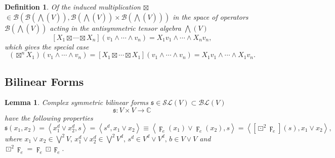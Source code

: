 \documentclass[aps,preprint]{revtex4}%
\newtheorem{definition}[theorem]{Definition}
\newtheorem{lemma}[theorem]{Lemma}
\begin{document}
\begin{definition}
Of the induced multiplication $\boxtimes$ $\in\mathcal{B}\left(
\mathcal{B}\left(
{\textstyle\bigwedge}
\left(  \overset{}{V}\right)  \right)  ,\mathcal{B}\left(
{\textstyle\bigwedge}
\left(  \overset{}{V}\right)  \right)  \times\mathcal{B}\left(
{\textstyle\bigwedge}
\left(  \overset{}{V}\right)  \right)  \right)  $ in the space of operators
$\mathcal{B}\left(
{\textstyle\bigwedge}
\left(  \overset{}{V}\right)  \right)  $ acting in the antisymmetric tensor
algebra $%
{\textstyle\bigwedge}
\left(  V\right)  $
\begin{equation}
\left[  X_{1}\boxtimes\cdots\boxtimes X_{n}\right]  \left(  v_{1}\wedge
\cdots\wedge v_{n}\right)  =X_{1}v_{1}\wedge\cdots\wedge X_{n}v_{n},
\end{equation}
which gives the special case
\begin{equation}
\left(  \boxtimes^{n}X_{1}\right)  \left(  v_{1}\wedge\cdots\wedge
v_{n}\right)  =\left[  X_{1}\boxtimes\cdots\boxtimes X_{1}\right]  \left(
v_{1}\wedge\cdots\wedge v_{n}\right)  =X_{1}v_{1}\wedge\cdots\wedge X_{1}%
v_{n}.
\end{equation}

\end{definition}

\subsection{Bilinear Forms}

\begin{lemma}
Complex symmetric bilinear forms $\mathfrak{s\in}\mathcal{SL}\left(  V\right)
\subset\mathcal{BL}\left(  V\right)  $%
\begin{equation}
\mathfrak{s}:V\times V\rightarrow\mathbb{C}%
\end{equation}
have the following properties
\begin{equation}
\mathfrak{s}\left(  x_{1},x_{2}\right)  =\left\langle x_{1}^{d}\vee x_{2}%
^{d},s\right\rangle =\left\langle s^{d},x_{1}\vee x_{2}\right\rangle
\equiv\left\langle \digamma_{e}\left(  x_{1}\right)  \vee\digamma_{e}\left(
x_{2}\right)  ,s\right\rangle =\left\langle \left[  \boxdot^{2}\digamma
_{e}\right]  \left(  s\right)  ,x_{1}\vee x_{2}\right\rangle ,
\end{equation}
where $x_{1}\vee x_{2}\in\bigvee\nolimits^{2}V,\,x_{1}^{d}\vee x_{2}^{d}%
\in\bigvee\nolimits^{2}V^{d},\,s^{d}\in V^{d}\vee V^{d},\,b\in V\vee V$ and
$\boxdot^{2}\digamma_{e}=\digamma_{e}\boxdot\digamma_{e}.$
\end{lemma}
\end{document}
